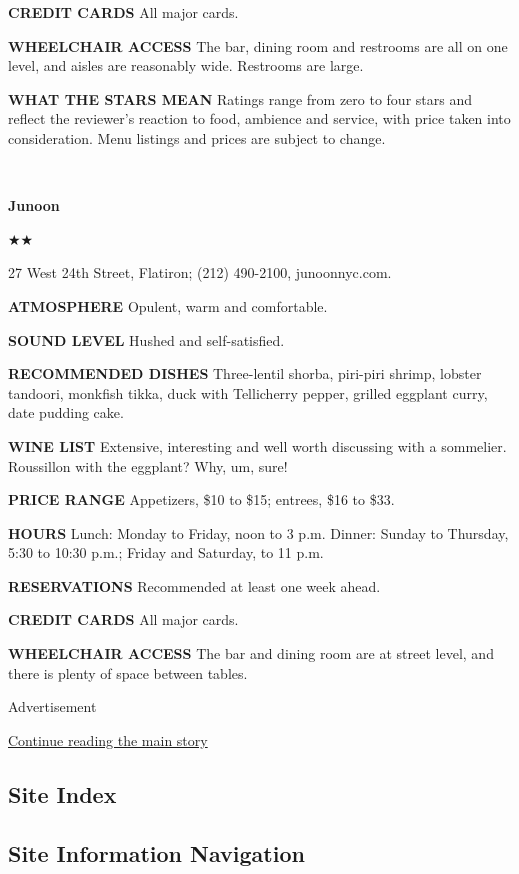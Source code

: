 \textbf{CREDIT CARDS} All major cards.

\textbf{WHEELCHAIR ACCESS} The bar, dining room and restrooms are all on
one level, and aisles are reasonably wide. Restrooms are large.

\textbf{WHAT THE STARS MEAN} Ratings range from zero to four stars and
reflect the reviewer's reaction to food, ambience and service, with
price taken into consideration. Menu listings and prices are subject to
change.

~

\textbf{Junoon}

★★

27 West 24th Street, Flatiron; (212) 490-2100, junoonnyc.com.

\textbf{ATMOSPHERE} Opulent, warm and comfortable.

\textbf{SOUND LEVEL} Hushed and self-satisfied.

\textbf{RECOMMENDED DISHES} Three-lentil shorba, piri-piri shrimp,
lobster tandoori, monkfish tikka, duck with Tellicherry pepper, grilled
eggplant curry, date pudding cake.

\textbf{WINE LIST} Extensive, interesting and well worth discussing with
a sommelier. Roussillon with the eggplant? Why, um, sure!

\textbf{PRICE RANGE} Appetizers, \$10 to \$15; entrees, \$16 to \$33.

\textbf{HOURS} Lunch: Monday to Friday, noon to 3 p.m. Dinner: Sunday to
Thursday, 5:30 to 10:30 p.m.; Friday and Saturday, to 11 p.m.

\textbf{RESERVATIONS} Recommended at least one week ahead.

\textbf{CREDIT CARDS} All major cards.

\textbf{WHEELCHAIR ACCESS} The bar and dining room are at street level,
and there is plenty of space between tables.

Advertisement

\protect\hyperlink{after-bottom}{Continue reading the main story}

\hypertarget{site-index}{%
\subsection{Site Index}\label{site-index}}

\hypertarget{site-information-navigation}{%
\subsection{Site Information
Navigation}\label{site-information-navigation}}

